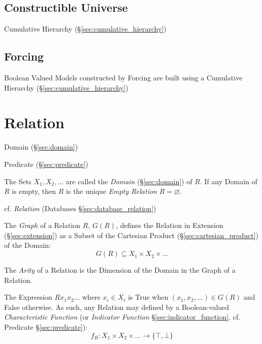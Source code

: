 


\subsection{Constructible Universe}\label{sec:constrictible_universe}

Cumulative Hierarchy (\S\ref{sec:cumulative_hierarchy})



\subsection{Forcing}\label{sec:forcing}

Boolean Valued Models constructed by Forcing are built using a
Cumulative Hierarchy (\S\ref{sec:cumulative_hierarchy})



\section{Relation}\label{sec:set_relation}

Domain (\S\ref{sec:domain})

Predicate (\S\ref{sec:predicate})

The Sets $X_1, X_2, \ldots$ are called the \emph{Domain}
(\S\ref{sec:domain}) of $R$. If any Domain of $R$ is empty, then $R$
is the unique \emph{Empty Relation} $R = \varnothing$.

\fist cf. \emph{Relation} (Databases \S\ref{sec:database_relation})

The \emph{Graph} of a Relation $R$, $G(R)$, defines the Relation in
Extension (\S\ref{sec:extension}) as a Subset of the Cartesian Product
(\S\ref{sec:cartesian_product}) of the Domain:
\[
  G(R) \subseteq X_1 \times X_2 \times \ldots
\]

The \emph{Arity} of a Relation is the Dimension of the Domain in the
Graph of a Relation. %

The Expression $R x_1 x_2 \ldots$ where $x_i \in X_i$ is True when
$(x_1, x_2, \ldots) \in G(R)$ and False otherwise. As such, any
Relation may defined by a Boolean-valued \emph{Characteristic
  Function} (or \emph{Indicator Function}
\S\ref{sec:indicator_function}, cf. Predicate \S\ref{sec:predicate}):
\[
  f_R : X_1 \times X_2 \times \ldots \to \{\top,\bot\}
\]

